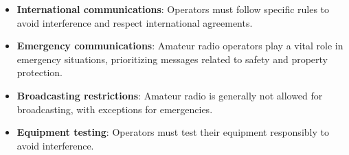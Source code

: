 \begin{itemize}
    \item \textbf{International communications}: Operators must follow specific rules to avoid interference and respect international agreements.
    \item \textbf{Emergency communications}: Amateur radio operators play a vital role in emergency situations, prioritizing messages related to safety and property protection.
    \item \textbf{Broadcasting restrictions}: Amateur radio is generally not allowed for broadcasting, with exceptions for emergencies.
    \item \textbf{Equipment testing}: Operators must test their equipment responsibly to avoid interference.
\end{itemize}
